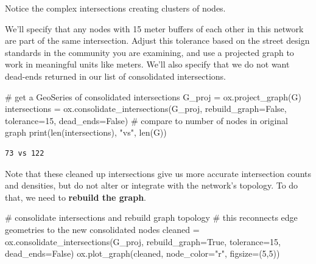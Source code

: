 \documentclass[
  letterpaper,
  DIV=11,
  numbers=noendperiod]{scrreprt}
\newenvironment{Shaded}{\begin{snugshade}}{\end{snugshade}}
\newcommand{\BuiltInTok}[1]{\textcolor[rgb]{0.00,0.23,0.31}{#1}}
\newcommand{\CommentTok}[1]{\textcolor[rgb]{0.37,0.37,0.37}{#1}}
\newcommand{\DecValTok}[1]{\textcolor[rgb]{0.68,0.00,0.00}{#1}}
\newcommand{\NormalTok}[1]{\textcolor[rgb]{0.00,0.23,0.31}{#1}}
\newcommand{\OperatorTok}[1]{\textcolor[rgb]{0.37,0.37,0.37}{#1}}
\newcommand{\StringTok}[1]{\textcolor[rgb]{0.13,0.47,0.30}{#1}}
\newcommand{\VariableTok}[1]{\textcolor[rgb]{0.07,0.07,0.07}{#1}}
\begin{document}
Notice the complex intersections creating clusters of nodes.

We'll specify that any nodes with 15 meter buffers of each other in this
network are part of the same intersection. Adjust this tolerance based
on the street design standards in the community you are examining, and
use a projected graph to work in meaningful units like meters. We'll
also specify that we do not want dead-ends returned in our list of
consolidated intersections.

\begin{Shaded}
\begin{Highlighting}[]
\CommentTok{\# get a GeoSeries of consolidated intersections}
\NormalTok{G\_proj }\OperatorTok{=}\NormalTok{ ox.project\_graph(G)}
\NormalTok{intersections }\OperatorTok{=}\NormalTok{ ox.consolidate\_intersections(G\_proj, rebuild\_graph}\OperatorTok{=}\VariableTok{False}\NormalTok{, tolerance}\OperatorTok{=}\DecValTok{15}\NormalTok{, dead\_ends}\OperatorTok{=}\VariableTok{False}\NormalTok{)}
\CommentTok{\# compare to number of nodes in original graph}
\BuiltInTok{print}\NormalTok{(}\BuiltInTok{len}\NormalTok{(intersections), }\StringTok{"vs"}\NormalTok{, }\BuiltInTok{len}\NormalTok{(G))}
\end{Highlighting}
\end{Shaded}

\begin{verbatim}
73 vs 122
\end{verbatim}

Note that these cleaned up intersections give us more accurate
intersection counts and densities, but do not alter or integrate with
the network's topology. To do that, we need to \textbf{rebuild the
graph}.

\begin{Shaded}
\begin{Highlighting}[]
\CommentTok{\# consolidate intersections and rebuild graph topology}
\CommentTok{\# this reconnects edge geometries to the new consolidated nodes}
\NormalTok{cleaned }\OperatorTok{=}\NormalTok{ ox.consolidate\_intersections(G\_proj, rebuild\_graph}\OperatorTok{=}\VariableTok{True}\NormalTok{, tolerance}\OperatorTok{=}\DecValTok{15}\NormalTok{, dead\_ends}\OperatorTok{=}\VariableTok{False}\NormalTok{)}
\NormalTok{ox.plot\_graph(cleaned, node\_color}\OperatorTok{=}\StringTok{"r"}\NormalTok{, figsize}\OperatorTok{=}\NormalTok{(}\DecValTok{5}\NormalTok{,}\DecValTok{5}\NormalTok{))}
\end{Highlighting}
\end{Shaded}
\end{document}
